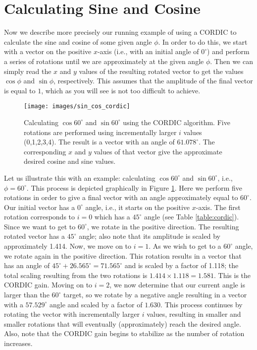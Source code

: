 \section{Calculating Sine and Cosine}

Now we describe more precisely our running example of using a CORDIC to calculate the sine and cosine of some given angle $\phi$. In order to do this, we start with a vector on the positive $x$-axis (i.e., with an initial angle of $0^{\circ}$) and perform a series of rotations until we are approximately at the given angle $\phi$. Then we can simply read the $x$ and $y$ values of the resulting rotated vector to get the values $\cos \phi$ and $\sin \phi$, respectively. This assumes that the amplitude of the final vector is equal to $1$, which as you will see is not too difficult to achieve.

\begin{figure}
\centering
\texttt{[image: images/sin\_cos\_cordic]}
\caption{Calculating $\cos 60^{\circ}$ and $\sin 60^{\circ}$ using the CORDIC algorithm. Five rotations are performed using incrementally larger $i$ values (0,1,2,3,4). The result is a vector with an angle of $61.078^{\circ}$. The corresponding $x$ and $y$ values of that vector give the approximate desired cosine and sine values. }
\label{fig:cordic_rotations}
\end{figure}

Let us illustrate this with an example: calculating $ \cos 60^{\circ}$ and $\sin 60^{\circ}$, i.e., $\phi = 60^{\circ}$. This process is depicted graphically in Figure \ref{fig:cordic_rotations}. Here we perform five rotations in order to give a final vector with an angle approximately equal to $60^{\circ}$. Our initial vector has a $0^{\circ}$ angle, i.e., it starts on the positive $x$-axis. The first rotation corresponds to $i=0$ which has a $45^{\circ}$ angle (see Table \ref{table:cordic}). Since we want to get to $60^{\circ}$, we rotate in the positive direction. The resulting rotated vector has a $45^{\circ}$ angle; also note that its amplitude is scaled by approximately 1.414. Now, we move on to $i=1$. As we wish to get to a $60^{\circ}$ angle, we rotate again in the positive direction. This rotation results in a vector that has an angle of $45^{\circ} + 26.565^{\circ} = 71.565^{\circ}$ and is scaled by a factor of 1.118; the total scaling resulting from the two rotations is $1.414 \times 1.118 = 1.581$. This is the CORDIC gain. Moving on to $i=2$, we now determine that our current angle is larger than the $60^{\circ}$ target, so we rotate by a negative angle resulting in a vector with a $57.529^{\circ}$ angle and scaled by a factor of $1.630$. This process continues by rotating the vector with incrementally larger $i$ values, resulting in smaller and smaller rotations that will eventually (approximately) reach the desired angle.  Also, note that the CORDIC gain begins to stabilize as the number of rotation increases.

